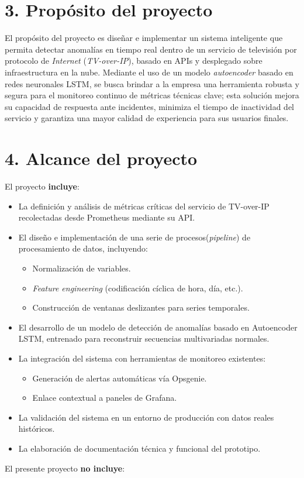 \documentclass[
11pt, %
]{charter}
\begin{document}
\section{3. Propósito del proyecto}
\label{sec:proposito}
El propósito del proyecto es diseñar e implementar un sistema inteligente que permita detectar anomalías en tiempo real dentro de un servicio de televisión por protocolo de \textit{Internet} (\textit{TV-over-IP}), basado en APIs y desplegado sobre infraestructura en la nube. Mediante el uso de un modelo \textit{autoencoder} basado en redes neuronales LSTM, se busca brindar a la empresa una herramienta robusta y segura para el monitoreo continuo de métricas técnicas clave; esta solución mejora su capacidad de respuesta ante incidentes, minimiza el tiempo de inactividad del servicio y garantiza una mayor calidad de experiencia para sus usuarios finales. 

\section{4. Alcance del proyecto}
\label{sec:alcance}

El proyecto \textbf{incluye}:
\begin{itemize}
    \item La definición y análisis de métricas críticas del servicio de TV-over-IP recolectadas desde Prometheus mediante su API.
    \item El diseño e implementación de una serie de procesos(\textit{pipeline}) de procesamiento de datos, incluyendo:
    \begin{itemize}
        \item Normalización de variables.
        \item \textit{Feature engineering} (codificación cíclica de hora, día, etc.).
        \item Construcción de ventanas deslizantes para series temporales.
    \end{itemize}
    \item El desarrollo de un modelo de detección de anomalías basado en Autoencoder LSTM, entrenado para reconstruir secuencias multivariadas normales.
    \item La integración del sistema con herramientas de monitoreo existentes:
    \begin{itemize}
        \item Generación de alertas automáticas vía Opsgenie.
        \item Enlace contextual a paneles de Grafana.
    \end{itemize}
    \item La validación del sistema en un entorno de producción con datos reales históricos.
    \item La elaboración de documentación técnica y funcional del prototipo.
\end{itemize}
El presente proyecto \textbf{no incluye}:
\end{document}
